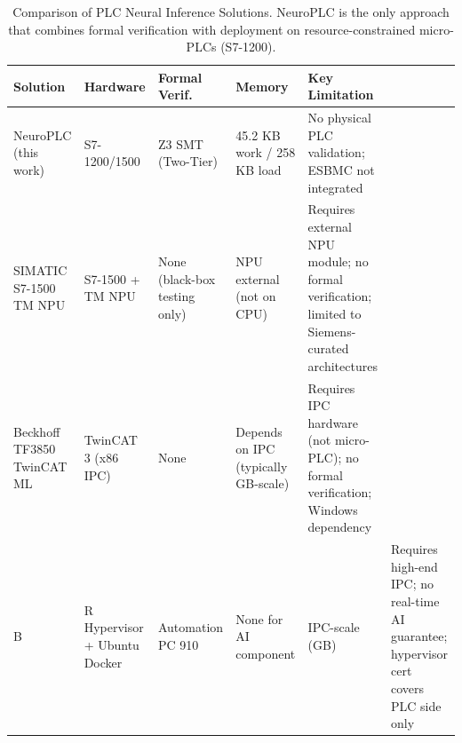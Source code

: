 \begin{table}[t]
\centering
\caption{Comparison of PLC Neural Inference Solutions. NeuroPLC is the only approach that combines formal verification with deployment on resource-constrained micro-PLCs (S7-1200).}
\label{tab:competitor_comparison}
\small
\begin{tabular}{p{2.4cm}p{2.4cm}p{1.8cm}p{2.0cm}p{2.8cm}}
\toprule
\textbf{Solution} & \textbf{Hardware} & \textbf{Formal Verif.} & \textbf{Memory} & \textbf{Key Limitation} \\
\midrule
  NeuroPLC (this work) & S7-1200/1500 & Z3 SMT (Two-Tier) & 45.2 KB work / 258 KB load & No physical PLC validation; ESBMC not integrated \\
  SIMATIC S7-1500 TM NPU & S7-1500 + TM NPU & None (black-box testing only) & NPU external (not on CPU) & Requires external NPU module; no formal verification; limited to Siemens-curated architectures \\
  Beckhoff TF3850 TwinCAT ML & TwinCAT 3 (x86 IPC) & None & Depends on IPC (typically GB-scale) & Requires IPC hardware (not micro-PLC); no formal verification; Windows dependency \\
  B&R Hypervisor + Ubuntu Docker & Automation PC 910 & None for AI component & IPC-scale (GB) & Requires high-end IPC; no real-time AI guarantee; hypervisor cert covers PLC side only \\
\bottomrule
\end{tabular}
\end{table}
